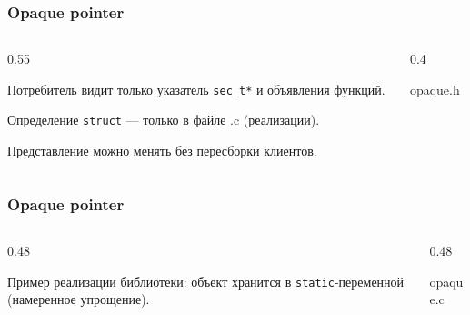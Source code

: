 \documentclass[compress, 8pt, aspectratio=169]{beamer}
\begin{document}
\begin{frame}[fragile]

    \frametitle{Opaque pointer}

    \begin{columns}[T]

        \begin{column}{0.55\textwidth}

            \begin{myitemize}

                \item Потребитель видит только указатель \texttt{sec\_t*}
                    и объявления функций.

                \item Определение \texttt{struct} --- только в файле .c
                    (реализации).

                \item Представление можно менять без пересборки клиентов.

            \end{myitemize}

        \end{column}

        \begin{column}{0.4\textwidth}

                {opaque.h}

        \end{column}

    \end{columns}

\end{frame}

\begin{frame}[fragile]

    \frametitle{Opaque pointer}

    \begin{columns}[T]

        \begin{column}{0.48\textwidth}

        Пример реализации библиотеки: объект хранится
        в \texttt{static}-переменной (намеренное упрощение).

        \end{column}

        \begin{column}{0.48\textwidth}

                {opaque.c}

        \end{column}

    \end{columns}

\end{frame}
\end{document}
